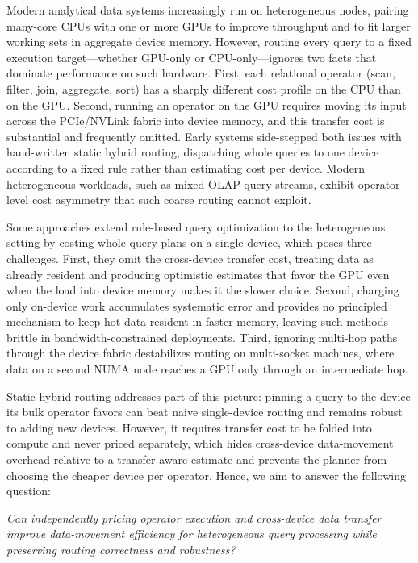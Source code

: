 \documentclass{article}
\begin{document}
Modern analytical data systems increasingly run on heterogeneous nodes, pairing
many-core CPUs with one or more GPUs to improve throughput and to fit larger
working sets in aggregate device memory. However, routing every query to a fixed
execution target---whether GPU-only or CPU-only---ignores two facts that dominate
performance on such hardware. First, each relational operator (scan, filter,
join, aggregate, sort) has a sharply different cost profile on the CPU than on
the GPU. Second, running an operator on the GPU requires moving its input across
the PCIe/NVLink fabric into device memory, and this transfer cost is substantial
and frequently omitted. Early systems side-stepped both issues with hand-written
static hybrid routing, dispatching whole queries to one device according to a
fixed rule rather than estimating cost per device. Modern heterogeneous
workloads, such as mixed OLAP query streams, exhibit operator-level cost
asymmetry that such coarse routing cannot exploit.

Some approaches extend rule-based query optimization to the heterogeneous setting
by costing whole-query plans on a single device, which poses three challenges.
First, they omit the cross-device transfer cost, treating data as already
resident and producing optimistic estimates that favor the GPU even when the
load into device memory makes it the slower choice. Second, charging only
on-device work accumulates systematic error and provides no principled mechanism
to keep hot data resident in faster memory, leaving such methods brittle in
bandwidth-constrained deployments. Third, ignoring multi-hop paths through the
device fabric destabilizes routing on multi-socket machines, where data on a
second NUMA node reaches a GPU only through an intermediate hop.

Static hybrid routing addresses part of this picture: pinning a query to the
device its bulk operator favors can beat naive single-device routing and remains
robust to adding new devices. However, it requires transfer cost to be folded
into compute and never priced separately, which hides cross-device data-movement
overhead relative to a transfer-aware estimate and prevents the planner from
choosing the cheaper device per operator. Hence, we aim to answer the following
question:

\begin{center}
\emph{Can independently pricing operator execution and cross-device data transfer
improve data-movement efficiency for heterogeneous query processing while
preserving routing correctness and robustness?}
\end{center}
\end{document}

